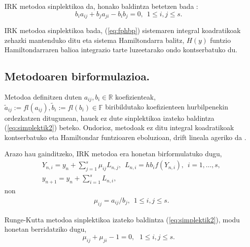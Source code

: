 IRK metodoa sinplektikoa da, honako baldintza betetzen bada  \cite{JMSanz-Serna1994}:
\begin{equation}
\label{eq:simplektik2}
b_{i}a_{ij}+b_{j}a_{ji}-b_{i}b_{j}=0, \ \ 1 \leqslant i,j \leqslant s.
\end{equation}   

IRK metodoa sinplektikoa bada, (\ref{eq:fphbp}) sistemaren integral koadratikoak zehazki mantenduko ditu eta sistema Hamiltondarra balitz, $H(y)$ funtzio Hamiltondarraren balioa integrazio tarte luzeetarako ondo kontserbatuko du.

\subsection{Metodoaren birformulazioa.}

Metodoa definitzen duten $a_{ij},b_i  \in \mathbb{R}$ koefizienteak, $\tilde a_{ij}:=fl(a_{ij}),\tilde b_i:=fl(b_i) \in \mathbb{F}$ biribildutako koefizienteen hurbilpenekin ordezkatzen ditugunean, hauek ez dute sinplektikoa izateko baldintza (\ref{eq:simplektik2}) beteko. Ondorioz, metodoak ez ditu integral koadratikoak kontserbatuko eta Hamiltondar funtzioaren eboluzioan, drift lineala ageriko da \cite{JMSanz-Serna1994}.    
  
Arazo hau gainditzeko, IRK metodoa era honetan birformulatuko dugu,
\begin{align}
\label{eq:irk1}
&Y_{n,i}=y_n+ \sum\limits_{j=1}^{s} \mu_{ij} L_{n,j},  \ \ L_{n,i}=hb_if(Y_{n,i}), \ \ i=1,\dots,s,\\
\label{eq:irk2}
&y_{n+1}=y_n+\sum\limits_{i=1}^{s} L_{n,i},
\end{align}
non 
\begin{align*}
&\mu_{ij}=a_{ij}/{b_j}, \ \ 1 \leqslant i,j \leqslant s.
\end{align*}

Runge-Kutta metodoa sinplektikoa izateko baldintza (\ref{eq:simplektik2}), modu honetan berridatziko dugu,
\begin{equation}
\label{eq:sinplekmij}
\mu_{ij}+\mu_{ji}-1=0, \ \ \ 1 \leqslant i,j \leqslant s.
\end{equation}
 
